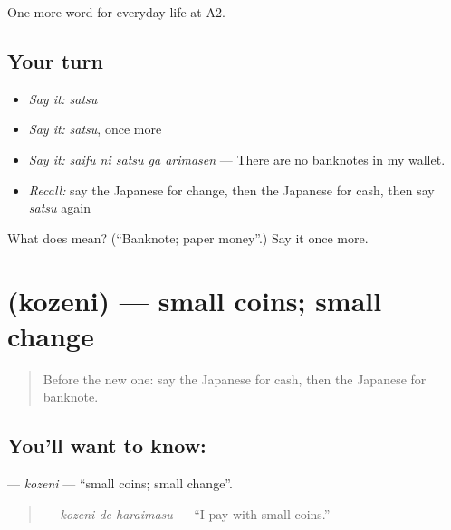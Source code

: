 \begin{grammarlens}[title={What you've built}]
One more word for everyday life at A2.
\end{grammarlens}

\subsection*{Your turn}
\begin{itemize}
\raggedright
  \item \emph{Say it:} \emph{satsu}
  \item \emph{Say it:} \emph{satsu}, once more
  \item \emph{Say it:} \emph{saifu ni satsu ga arimasen} — There are no banknotes in my wallet.
  \item \emph{Recall:} say the Japanese for change, then the Japanese for cash, then say \emph{satsu} again
\end{itemize}

\begin{tcolorbox}[breakable,colback=teal!4,colframe=teal!35!black,title={Before you move on}]
What does  mean? (\textquotedblleft{}Banknote; paper money\textquotedblright{}.) Say it once more.
\end{tcolorbox}
\section[\texorpdfstring{\ja{こぜに} (kozeni)}{こぜに (kozeni)}]{ (kozeni) — small coins; small change}

\label{lesson:JA-C182-kozeni}



\begin{quote}
Before the new one: say the Japanese for cash, then the Japanese for banknote.
\end{quote}

\subsection*{You'll want to know: }
\textbf{} — \emph{kozeni} — \textquotedblleft{}small coins; small change\textquotedblright{}.

\begin{quote}
\textbf{ } — \emph{kozeni de haraimasu} — \textquotedblleft{}I pay with small coins.\textquotedblright{}
\end{quote}

